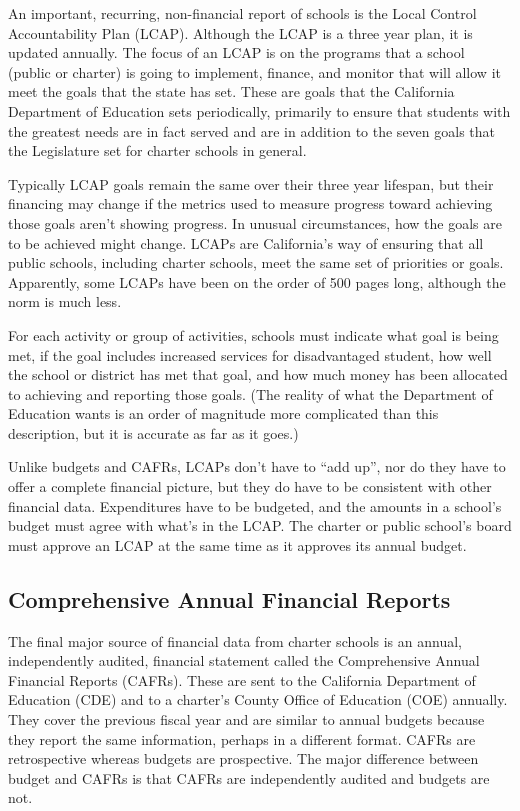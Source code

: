 An important, recurring, non-financial report of schools is the Local Control Accountability Plan (LCAP). Although the LCAP is a three year plan, it is updated annually. The focus of an LCAP is on the programs that a school (public or charter) is going to implement, finance, and monitor that will allow it meet the goals that the state has set. These are goals that the California Department of Education sets periodically, primarily to ensure that students with the greatest needs are in fact served and are in addition to the seven goals that the Legislature set for charter schools in general.

Typically LCAP goals remain the same over their three year lifespan, but their financing may change if the metrics used to measure progress toward achieving those goals aren't showing progress. In unusual circumstances, how the goals are to be achieved might change. LCAPs are California's way of ensuring that all public schools, including charter schools, meet the same set of priorities or goals. Apparently, some LCAPs have been on the order of 500 pages long, although the norm is much less.

For each activity or group of activities, schools must indicate what goal is being met, if the goal includes increased services for disadvantaged student, how well the school or district has met that goal, and how much money has been allocated to achieving and reporting those goals. (The reality of what the Department of Education wants is an order of magnitude more complicated than this description, but it is accurate as far as it goes.)

Unlike budgets and CAFRs, LCAPs don't have to ``add up'', nor do they have to offer a complete financial picture, but they do have to be consistent with other financial data. Expenditures have to be budgeted, and the amounts in a school's budget must agree with what's in the LCAP\@. The charter or public school's board must approve an LCAP at the same time as it approves its annual budget. %

\subsection{Comprehensive Annual Financial Reports}\label{sec:CAFRs}\indent

The final major source of financial data from charter schools is an annual, independently audited, financial statement called the Comprehensive Annual Financial Reports (CAFRs). These are sent to the California Department of Education (CDE) and to a charter's County Office of Education (COE) annually. They cover the previous fiscal year and are similar to annual budgets because they report the same information, perhaps in a different format. CAFRs are retrospective whereas budgets are prospective. The major difference between budget and CAFRs is that CAFRs are independently audited and budgets are not. 

